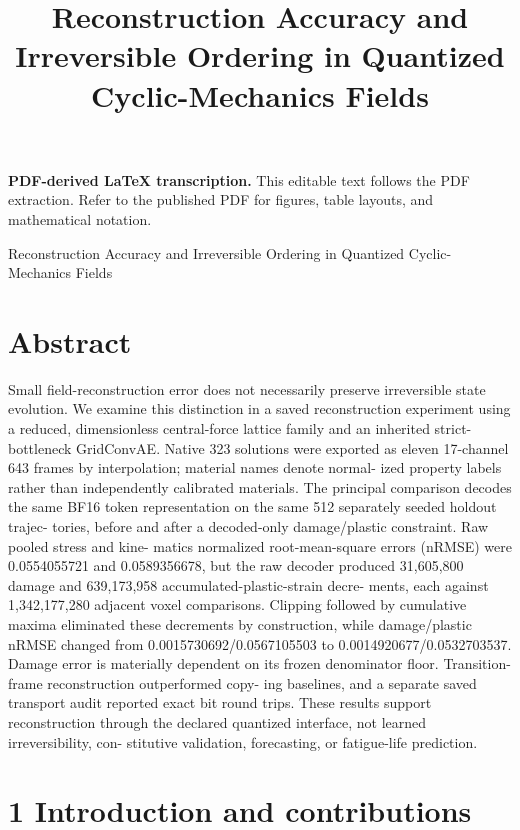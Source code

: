 \documentclass[11pt]{article}
\title{Reconstruction Accuracy and Irreversible Ordering in Quantized Cyclic-Mechanics Fields}
\author{}
\date{}
\begin{document}
\maketitle
\noindent\textbf{PDF-derived LaTeX transcription.} This editable text follows the PDF extraction. Refer to the published PDF for figures, table layouts, and mathematical notation.


Reconstruction Accuracy and Irreversible Ordering in Quantized
Cyclic-Mechanics Fields

\section*{Abstract}

Small field-reconstruction error does not necessarily preserve irreversible state evolution. We
examine this distinction in a saved reconstruction experiment using a reduced, dimensionless
central-force lattice family and an inherited strict-bottleneck GridConvAE. Native 323 solutions
were exported as eleven 17-channel 643 frames by interpolation; material names denote normal-
ized property labels rather than independently calibrated materials. The principal comparison
decodes the same BF16 token representation on the same 512 separately seeded holdout trajec-
tories, before and after a decoded-only damage/plastic constraint. Raw pooled stress and kine-
matics normalized root-mean-square errors (nRMSE) were 0.0554055721 and 0.0589356678, but
the raw decoder produced 31,605,800 damage and 639,173,958 accumulated-plastic-strain decre-
ments, each against 1,342,177,280 adjacent voxel comparisons. Clipping followed by cumulative
maxima eliminated these decrements by construction, while damage/plastic nRMSE changed
from 0.0015730692/0.0567105503 to 0.0014920677/0.0532703537. Damage error is materially
dependent on its frozen denominator floor. Transition-frame reconstruction outperformed copy-
ing baselines, and a separate saved transport audit reported exact bit round trips. These results
support reconstruction through the declared quantized interface, not learned irreversibility, con-
stitutive validation, forecasting, or fatigue-life prediction.

\section*{1 Introduction and contributions}
\end{document}
